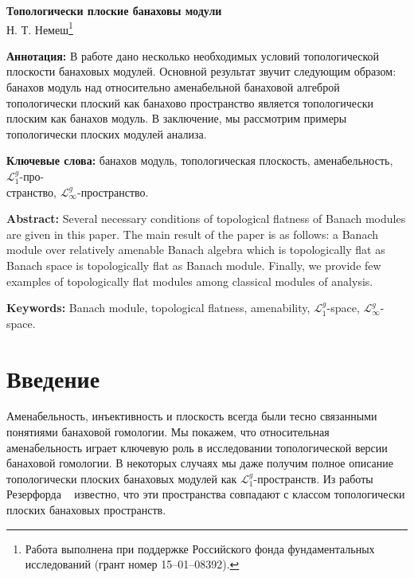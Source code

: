 \documentclass[12pt]{article}
\begin{document}
\begin{center}
\Large \textbf{Топологически плоские банаховы модули}\\[0.5cm]
\small {Н. Т. Немеш}\footnote{Работа выполнена при поддержке Российского фонда
фундаментальных исследований (грант номер 15--01--08392).}\\[0.5cm]
\end{center}

\thispagestyle{empty}

\medskip
\textbf{Аннотация:} В работе дано несколько необходимых условий топологической
плоскости банаховых модулей. Основной результат звучит следующим образом:
банахов модуль над относительно аменабельной банаховой алгеброй топологически
плоский как банахово пространство является топологически плоским как банахов
модуль. В заключение, мы рассмотрим примеры топологически плоских модулей
анализа.

\medskip
\textbf{Ключевые слова:} банахов модуль, топологическая плоскость,
аменабельность, $\mathcal{L}_1^g$-про-\\странство,
$\mathcal{L}_\infty^g$-пространство.

\textbf{Abstract:} Several necessary conditions of topological flatness of
Banach modules are given in this paper. The main result of the paper is as
follows: a Banach module over relatively amenable Banach algebra which is
topologically flat as Banach space is topologically flat as Banach module.
Finally, we provide few examples of topologically flat modules among classical
modules of analysis.

\medskip
\textbf{Keywords:} Banach module, topological flatness, amenability,
$\mathcal{L}_1^g$-space, $\mathcal{L}_\infty^g$-space.

\bigskip


\section{Введение}\label{SectionIntroduction}

Аменабельность, инъективность и плоскость всегда были тесно связанными понятиями
банаховой гомологии. Мы покажем, что относительная аменабельность играет
ключевую роль в исследовании топологической версии банаховой гомологии. В
некоторых случаях мы даже получим полное описание топологически плоских
банаховых модулей как $\mathcal{L}_1^g$-пространств. Из работы Резерфорда
~\cite{StegRethNucOpL1LInfSp} известно, что эти пространства совпадают с классом
топологически плоских банаховых пространств. 
\end{document}
